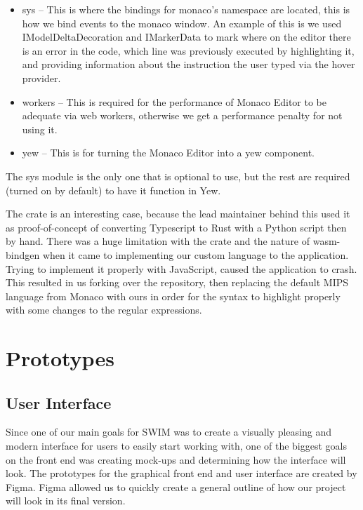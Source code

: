 \documentclass[
    paper=letter,
    parskip=half,
    fontsize=12pt,
    titlepage=firstiscover,
    toc=bibliography,
    numbers=endperiod
]{scrartcl}
\let\oldsection\section
\renewcommand{\section}{\newpage\oldsection}
\begin{document}
\begin{itemize}
    \item sys -- This is where the bindings for monaco's namespace are located,
          this is how we bind events to the monaco window. An example of this is
          we used IModelDeltaDecoration and IMarkerData to mark where on the
          editor there is an error in the code, which line was previously executed
          by highlighting it, and providing information about the instruction the
          user typed via the hover provider.
    \item workers -- This is required for the performance of Monaco Editor to be
          adequate via web workers, otherwise we get a performance penalty for not
          using it.
    \item yew -- This is for turning the Monaco Editor into a yew component.
\end{itemize}

The sys module is the only one that is optional to use, but the rest are
required (turned on by default) to have it function in Yew.

The crate is an interesting case, because the lead maintainer behind
this used it as proof-of-concept of converting Typescript to Rust with a
Python script then by hand. There was a huge limitation with the crate
and the nature of wasm-bindgen when it came to implementing our custom
language to the application. Trying to implement it properly with
JavaScript, caused the application to crash. This resulted in us forking
over the repository, then replacing the default MIPS language from
Monaco with ours in order for the syntax to highlight properly with some
changes to the regular expressions.

\section{Prototypes}

\subsection{User Interface}

Since one of our main goals for SWIM was to create a visually pleasing
and modern interface for users to easily start working with, one of the
biggest goals on the front end was creating mock-ups and determining how
the interface will look. The prototypes for the graphical front end and
user interface are created by Figma. Figma allowed us to quickly create
a general outline of how our project will look in its final version.
\end{document}
